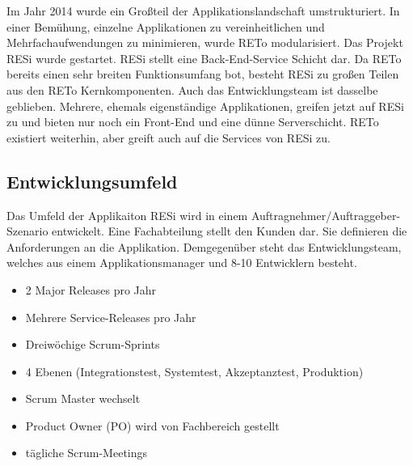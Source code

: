 Im Jahr 2014 wurde ein Großteil der Applikationslandschaft umstrukturiert. In einer Bemühung, einzelne Applikationen zu vereinheitlichen und Mehrfachaufwendungen zu minimieren, wurde RETo modularisiert. Das Projekt RESi wurde gestartet. RESi stellt eine Back-End-Service Schicht dar. Da RETo bereits einen sehr breiten Funktionsumfang bot, besteht RESi zu großen Teilen aus den RETo Kernkomponenten. Auch das Entwicklungsteam ist dasselbe geblieben. Mehrere, ehemals eigenständige Applikationen, greifen jetzt auf RESi zu und bieten nur noch ein Front-End und eine dünne Serverschicht. RETo existiert weiterhin, aber greift auch auf die Services von RESi zu.

\subsection{Entwicklungsumfeld}
Das Umfeld der Applikaiton RESi wird in einem Auftragnehmer/Auftraggeber-Szenario entwickelt. Eine Fachabteilung stellt den Kunden dar. Sie definieren die Anforderungen an die Applikation. Demgegenüber steht das Entwicklungsteam, welches aus einem Applikationsmanager und 8-10 Entwicklern besteht. 

\begin{itemize}
\item 2 Major Releases pro Jahr
\item Mehrere Service-Releases pro Jahr
\item Dreiwöchige Scrum-Sprints
\item 4 Ebenen (Integrationstest, Systemtest, Akzeptanztest, Produktion)
\item Scrum Master wechselt
\item Product Owner (PO) wird von Fachbereich gestellt
\item tägliche Scrum-Meetings
\end{itemize} 

